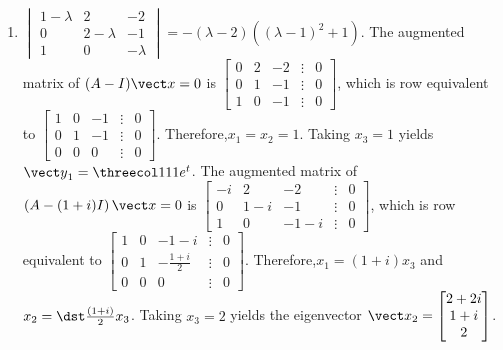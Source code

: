 \documentclass[openany]{book}
\newenvironment{sectionSolutions}{
 \begin{enumerate}[item-label={\thesection.\arabic{enumi}.}]
}{
 \end{enumerate}
}
\begin{document}
\begin{sectionSolutions}
\[
\dst{{\vect
y}=c_1\begin{bmatrix} 2\\ 2\\1 \end{bmatrix}e^{-2t}+
c_2e^{2t}\begin{bmatrix}-\cos3t-\sin3t\\-\sin3t\\
\cos3t\end{bmatrix}+c_3e^{2t}\begin{bmatrix}
-\sin3t+\cos3t\\\cos3t\\\sin3t\end{bmatrix}}.
\]


\item
$\begin{vmatrix}1-\lambda&2&-2\\0&2-\lambda&-1\\1
&0&-\lambda\end{vmatrix}=-(\lambda-2)\left((\lambda-1)^2+1\right)$.
The augmented matrix of $(A-I){\vect x=0}$ is
$\begin{bmatrix}0&2&-2&\vdots&0\\0&
1&-1&\vdots&0\\ 1&0&-1&\vdots&0
\end{bmatrix}$,
which is row equivalent to
$\begin{bmatrix} 1&0&-1&\vdots&0\\ 0&1&-1&
\vdots&0\\ 0&0&0&\vdots&0\end{bmatrix}$.
Therefore,$x_1=x_2=1$.  Taking $x_3=1$ yields
 ${\vect y}_1=\threecol111e^t$.
The augmented matrix of
$\left(A-(1+i)I\right){\vect x=0}$ is
$\begin{bmatrix}-i&2&-2&\vdots&0\\0&
1-i&-1&\vdots&0\\ 1&0&-1-i&\vdots&0
\end{bmatrix}$,
which is row equivalent to
$\begin{bmatrix} 1&0&-1-i&\vdots&0\\ 0&1&-\frac{1+i}{2}&
\vdots&0\\ 0&0&0&\vdots&0\end{bmatrix}$.
Therefore,$x_1=(1+i)x_3$ and $x_2=\dst\frac{(1+i)}{2}x_3$.
Taking $x_3=2$ yields the eigenvector
${\vect x}_2=\begin{bmatrix}2+2i\\1+i\\2\end{bmatrix}$.

\end{sectionSolutions}
\end{document}
